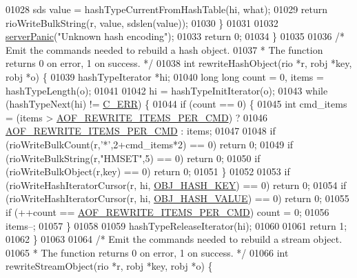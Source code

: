 \begin{DoxyCode}
{{{{{{{{{{{{{{{01028         sds value = hashTypeCurrentFromHashTable(hi, what);
01029         \textcolor{keywordflow}{return} rioWriteBulkString(r, value, sdslen(value));
01030     \}
01031 
01032     \hyperlink{server_8h_a11cc378e7778a830b41240578de3b204}{serverPanic}(\textcolor{stringliteral}{"Unknown hash encoding"});
01033     \textcolor{keywordflow}{return} 0;
01034 \}
01035 
01036 \textcolor{comment}{/* Emit the commands needed to rebuild a hash object.}
01037 \textcolor{comment}{ * The function returns 0 on error, 1 on success. */}
01038 \textcolor{keywordtype}{int} rewriteHashObject(rio *r, robj *key, robj *o) \{
01039     hashTypeIterator *hi;
01040     \textcolor{keywordtype}{long} \textcolor{keywordtype}{long} count = 0, items = hashTypeLength(o);
01041 
01042     hi = hashTypeInitIterator(o);
01043     \textcolor{keywordflow}{while} (hashTypeNext(hi) != \hyperlink{server_8h_af98ac28d5f4d23d7ed5985188e6fb7d1}{C\_ERR}) \{
01044         \textcolor{keywordflow}{if} (count == 0) \{
01045             \textcolor{keywordtype}{int} cmd\_items = (items > \hyperlink{server_8h_a437bda3214c8acb2835f49eb68919507}{AOF\_REWRITE\_ITEMS\_PER\_CMD}) ?
01046                 \hyperlink{server_8h_a437bda3214c8acb2835f49eb68919507}{AOF\_REWRITE\_ITEMS\_PER\_CMD} : items;
01047 
01048             \textcolor{keywordflow}{if} (rioWriteBulkCount(r,\textcolor{stringliteral}{'*'},2+cmd\_items*2) == 0) \textcolor{keywordflow}{return} 0;
01049             \textcolor{keywordflow}{if} (rioWriteBulkString(r,\textcolor{stringliteral}{"HMSET"},5) == 0) \textcolor{keywordflow}{return} 0;
01050             \textcolor{keywordflow}{if} (rioWriteBulkObject(r,key) == 0) \textcolor{keywordflow}{return} 0;
01051         \}
01052 
01053         \textcolor{keywordflow}{if} (rioWriteHashIteratorCursor(r, hi, \hyperlink{server_8h_aede46b2a96d6f19aff38ccdac76598ac}{OBJ\_HASH\_KEY}) == 0) \textcolor{keywordflow}{return} 0;
01054         \textcolor{keywordflow}{if} (rioWriteHashIteratorCursor(r, hi, \hyperlink{server_8h_a1f87a280688b29cd45aa3aa0dceac7c7}{OBJ\_HASH\_VALUE}) == 0) \textcolor{keywordflow}{return} 0;
01055         \textcolor{keywordflow}{if} (++count == \hyperlink{server_8h_a437bda3214c8acb2835f49eb68919507}{AOF\_REWRITE\_ITEMS\_PER\_CMD}) count = 0;
01056         items--;
01057     \}
01058 
01059     hashTypeReleaseIterator(hi);
01060 
01061     \textcolor{keywordflow}{return} 1;
01062 \}
01063 
01064 \textcolor{comment}{/* Emit the commands needed to rebuild a stream object.}
01065 \textcolor{comment}{ * The function returns 0 on error, 1 on success. */}
01066 \textcolor{keywordtype}{int} rewriteStreamObject(rio *r, robj *key, robj *o) \{
}}}}}}}}}}}}}}}
\end{DoxyCode}
